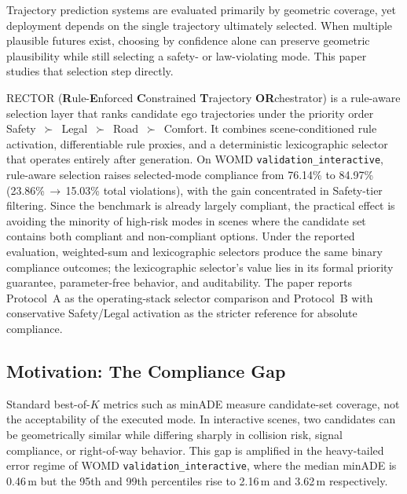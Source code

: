 Trajectory prediction systems are evaluated primarily by geometric coverage, yet deployment depends on the single trajectory ultimately selected. When multiple plausible futures exist, choosing by confidence alone can preserve geometric plausibility while still selecting a safety- or law-violating mode. This paper studies that selection step directly.

\textsc{RECTOR} (\textbf{R}ule-\textbf{E}nforced \textbf{C}onstrained \textbf{T}rajectory \textbf{OR}chestrator) is a rule-aware selection layer that ranks candidate ego trajectories under the priority order Safety~$\succ$~Legal~$\succ$~Road~$\succ$~Comfort. It combines scene-conditioned rule activation, differentiable rule proxies, and a deterministic lexicographic selector that operates entirely after generation. On WOMD \texttt{validation\_interactive}, rule-aware selection raises selected-mode compliance from 76.14\% to 84.97\% (23.86\%\,$\to$\,15.03\% total violations), with the gain concentrated in Safety-tier filtering. Since the benchmark is already largely compliant, the practical effect is avoiding the minority of high-risk modes in scenes where the candidate set contains both compliant and non-compliant options. Under the reported evaluation, weighted-sum and lexicographic selectors produce the same binary compliance outcomes; the lexicographic selector's value lies in its formal priority guarantee, parameter-free behavior, and auditability. The paper reports Protocol~A as the operating-stack selector comparison and Protocol~B with conservative Safety/Legal activation as the stricter reference for absolute compliance.

\subsection{Motivation: The Compliance Gap}
\label{subsec:motivation}

Standard best-of-$K$ metrics such as minADE measure candidate-set coverage, not the acceptability of the executed mode. In interactive scenes, two candidates can be geometrically similar while differing sharply in collision risk, signal compliance, or right-of-way behavior. This gap is amplified in the heavy-tailed error regime of WOMD \texttt{validation\_interactive}, where the median minADE is 0.46\,m but the 95th and 99th percentiles rise to 2.16\,m and 3.62\,m respectively.


